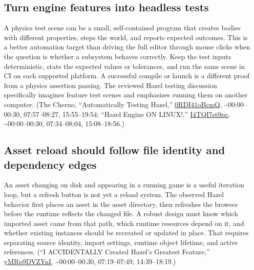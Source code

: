 \subsection{Turn engine features into headless tests}\label{06-engine-ii-ch041-turn-engine-features-into-headless-tests}

\hypertarget{06-engine-ii-ch041-turn-engine-features-into-headless-tests}{}

A physics test scene can be a small, self-contained program that creates bodies with different properties, steps the world, and reports expected outcomes. This is a better automation target than driving the full editor through mouse clicks when the question is whether a subsystem behaves correctly. Keep the test inputs deterministic, state the expected values or tolerances, and run the same scene in CI on each supported platform. A successful compile or launch is a different proof from a physics assertion passing. The reviewed Hazel testing discussion specifically imagines feature test scenes and emphasizes running them on another computer. (The Cherno, ``Automatically Testing Hazel,'' \href{https://www.youtube.com/watch?v=0RDI41oBcmQ}{0RDI41oBcmQ}, \textasciitilde00:00--00:30, 07:57--08:27, 15:55--19:54; ``Hazel Engine ON LINUX!,'' \href{https://www.youtube.com/watch?v=I4TQI7st0pc}{I4TQI7st0pc}, \textasciitilde00:00--00:30, 07:34--08:04, 15:08--18:56.)

\subsection{Asset reload should follow file identity and dependency edges}\label{06-engine-ii-ch041-asset-reload-should-follow-file-identity-and-dependency-edges}

\hypertarget{06-engine-ii-ch041-asset-reload-should-follow-file-identity-and-dependency-edges}{}

An asset changing on disk and appearing in a running game is a useful iteration loop, but a refresh button is not yet a reload system. The observed Hazel behavior first places an asset in the asset directory, then refreshes the browser before the runtime reflects the changed file. A robust design must know which imported asset came from that path, which runtime resources depend on it, and whether existing instances should be recreated or updated in place. That requires separating source identity, import settings, runtime object lifetime, and active references. (``I ACCIDENTALLY Created Hazel's Greatest Feature,'' \href{https://www.youtube.com/watch?v=yMRp9DVZYnI}{yMRp9DVZYnI}, \textasciitilde00:00--00:30, 07:19--07:49, 14:39--18:19.)

